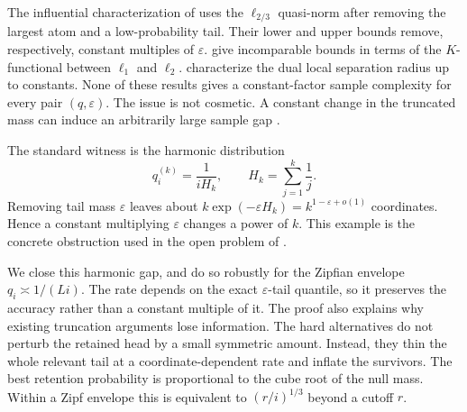 \documentclass{article}
\newcommand{\1}{\mathbf 1}
\begin{document}
The influential characterization of \citet{valiant2017automatic} uses the $\ell_{2/3}$ quasi-norm after removing the largest atom and a low-probability tail. Their lower and upper bounds remove, respectively, constant multiples of $\varepsilon$. \citet{blais2017distribution} give incomparable bounds in terms of the $K$-functional between $\ell_1$ and $\ell_2$. \citet{chhor2022sharp} characterize the dual local separation radius up to constants. None of these results gives a constant-factor sample complexity for every pair $(q,\varepsilon)$. The issue is not cosmetic. A constant change in the truncated mass can induce an arbitrarily large sample gap \citep{blais2017distribution,canonne2024open}.

The standard witness is the harmonic distribution \[ q^{(k)}_i=\frac{1}{iH_k},\qquad H_k=\sum_{j=1}^k\frac1j. \tag{1}\label{eq:harmonic} \] Removing tail mass $\varepsilon$ leaves about $k\exp(-\varepsilon H_k)=k^{1-\varepsilon+o(1)}$ coordinates. Hence a constant multiplying $\varepsilon$ changes a power of $k$. This example is the concrete obstruction used in the open problem of \citet{canonne2024open}.

We close this harmonic gap, and do so robustly for the Zipfian envelope $q_i\asymp1/(Li)$. The rate depends on the exact $\varepsilon$-tail quantile, so it preserves the accuracy rather than a constant multiple of it. The proof also explains why existing truncation arguments lose information. The hard alternatives do not perturb the retained head by a small symmetric amount. Instead, they thin the whole relevant tail at a coordinate-dependent rate and inflate the survivors. The best retention probability is proportional to the cube root of the null mass. Within a Zipf envelope this is equivalent to $(r/i)^{1/3}$ beyond a cutoff $r$.
\end{document}

